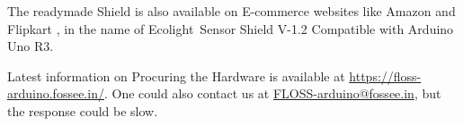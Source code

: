 
The readymade Shield is also available on E-commerce websites like Amazon \cite{amazon-shield}
and Flipkart \cite{flipkart-shield}, in the name of Ecolight\textregistered \ Sensor Shield V-1.2
Compatible with Arduino Uno R3.


Latest information on Procuring the Hardware is available at \url{https://floss-arduino.fossee.in/}. 
One could also contact us at \href{mailto:FLOSS-arduino@fossee.in}{FLOSS-arduino@fossee.in}, but the response could be slow.





